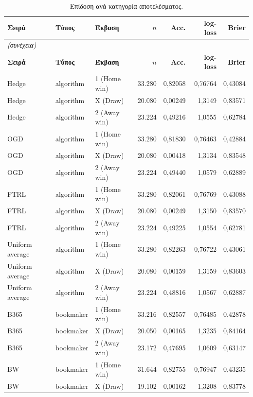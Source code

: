 {\footnotesize
\begin{longtable}{@{}lllrrrr@{}}
\caption{Επίδοση ανά κατηγορία αποτελέσματος.}\label{app:cls}\\
\toprule \textbf{Σειρά} & \textbf{Τύπος} & \textbf{Έκβαση} & \textbf{$n$} & \textbf{Acc.} & \textbf{log-loss} & \textbf{Brier} \\\midrule\endfirsthead
\multicolumn{7}{l}{\emph{(συνέχεια)}}\\\toprule \textbf{Σειρά} & \textbf{Τύπος} & \textbf{Έκβαση} & \textbf{$n$} & \textbf{Acc.} & \textbf{log-loss} & \textbf{Brier} \\\midrule\endhead
\bottomrule\endfoot
Hedge & algorithm & 1 (Home win) & 33.280 & 0,82058 & 0,76764 & 0,43084 \\
Hedge & algorithm & X (Draw) & 20.080 & 0,00249 & 1,3149 & 0,83571 \\
Hedge & algorithm & 2 (Away win) & 23.224 & 0,49216 & 1,0555 & 0,62784 \\
OGD & algorithm & 1 (Home win) & 33.280 & 0,81830 & 0,76463 & 0,42884 \\
OGD & algorithm & X (Draw) & 20.080 & 0,00418 & 1,3134 & 0,83548 \\
OGD & algorithm & 2 (Away win) & 23.224 & 0,49440 & 1,0579 & 0,62889 \\
FTRL & algorithm & 1 (Home win) & 33.280 & 0,82061 & 0,76769 & 0,43088 \\
FTRL & algorithm & X (Draw) & 20.080 & 0,00249 & 1,3150 & 0,83570 \\
FTRL & algorithm & 2 (Away win) & 23.224 & 0,49225 & 1,0554 & 0,62781 \\
Uniform average & algorithm & 1 (Home win) & 33.280 & 0,82263 & 0,76722 & 0,43061 \\
Uniform average & algorithm & X (Draw) & 20.080 & 0,00159 & 1,3159 & 0,83603 \\
Uniform average & algorithm & 2 (Away win) & 23.224 & 0,48816 & 1,0567 & 0,62887 \\
B365 & bookmaker & 1 (Home win) & 33.216 & 0,82557 & 0,76485 & 0,42878 \\
B365 & bookmaker & X (Draw) & 20.050 & 0,00165 & 1,3235 & 0,84164 \\
B365 & bookmaker & 2 (Away win) & 23.172 & 0,47695 & 1,0609 & 0,63147 \\
BW & bookmaker & 1 (Home win) & 31.644 & 0,82755 & 0,76947 & 0,43235 \\
BW & bookmaker & X (Draw) & 19.102 & 0,00162 & 1,3208 & 0,83778 \\

\end{longtable}}
